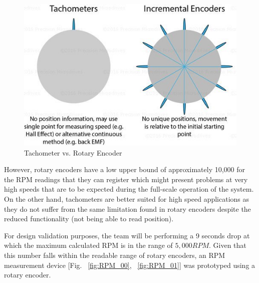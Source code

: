 \begin{figure}[H]
  \centering
  \includegraphics[width=.5\textwidth]{Controls/encoders.jpg}
  \caption{\label{fig:encoders}Tachometer vs. Rotary Encoder}
\end{figure}

However, rotary encoders have a low upper bound of approximately 10,000 for the RPM readings that they can register which might present problems at very high speeds that are to be expected during the full-scale operation of the system. On the other hand, tachometers are better suited for high speed applications as they do not suffer from the same limitation found in rotary encoders despite the reduced functionality (not being able to read position).

For design validation purposes, the team will be performing a 9 seconds drop at which the maximum calculated RPM is in the range of $5,000 RPM$. Given that this number falls within the readable range of rotary encoders, an RPM measurement device [Fig. ~\ref{fig:RPM_00}, ~\ref{fig:RPM_01}] was prototyped using a rotary encoder.

